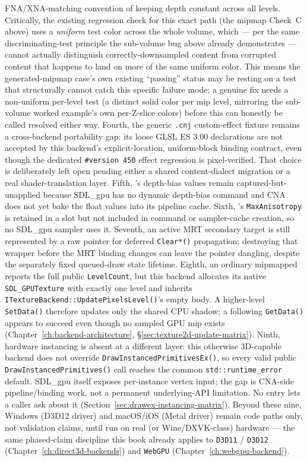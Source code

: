 FNA/XNA-matching convention of keeping depth constant across all levels. Critically, the
existing regression check for this exact path (the mipmap Check~C above) uses a
\emph{uniform} test color across the whole volume, which --- per the same discriminating-test
principle the sub-volume bug above already demonstrates --- cannot actually distinguish
correctly-downsampled content from corrupted content that happens to land on more of the same
uniform color. This means the generated-mipmap case's own existing ``passing'' status may be
resting on a test that structurally cannot catch this specific failure mode; a genuine fix
needs a non-uniform per-level test (a distinct solid color per mip level, mirroring the
sub-volume worked example's own per-Z-slice colors) before this can honestly be called
resolved either way. Fourth, the generic \texttt{.cnj} custom-effect fixture remains a
cross-backend portability gap: its loose GLSL ES 3.00 declarations are not accepted by this
backend's explicit-location, uniform-block binding contract, even though the dedicated
\texttt{\#version 450} effect regression is pixel-verified. That choice is deliberately left
open pending either a shared content-dialect migration or a real shader-translation layer.
Fifth, 's depth-bias values remain captured-but-unapplied because
SDL\_gpu has no dynamic depth-bias command and CNA does not yet bake the float values into its
pipeline cache. Sixth, 's \texttt{MaxAnisotropy} is retained in a slot
but not included in command or sampler-cache creation, so no SDL\_gpu sampler uses it. Seventh,
an active MRT secondary target is still represented by a raw pointer for deferred
\texttt{Clear\allowbreak{}*()} propagation; destroying that wrapper before the MRT binding changes can leave
the pointer dangling, despite the separately fixed queued-draw state lifetime. Eighth, an
ordinary mipmapped  reports the full public \texttt{LevelCount}, but this
backend allocates its native \texttt{SDL\_GPUTexture} with exactly one level and inherits
\texttt{ITextureBackend::UpdatePixelsLevel()}'s empty body. A higher-level
\texttt{SetData()} therefore updates only the shared CPU shadow; a following
\texttt{GetData()} appears to succeed even though no sampled GPU mip exists
(Chapter~\ref{ch:backend-architecture}, \S\ref{sec:texture2d-update-matrix}).
Ninth, hardware instancing is absent at a different layer: this otherwise 3D-capable backend
does not override \texttt{DrawInstancedPrimitivesEx()}, so every valid public
\texttt{DrawInstancedPrimitives()} call reaches the common
\texttt{std::runtime\_error} default. SDL\_gpu itself exposes per-instance vertex input; the
gap is CNA-side pipeline/binding work, not a permanent underlying-API limitation. No
 entry lets a caller ask about it
(Section~\ref{sec:drawex-instancing-matrix}).
Beyond these nine, Windows (D3D12 driver) and macOS/iOS (Metal driver)
remain code paths only, not validation claims, until run on real (or Wine/DXVK-class) hardware
--- the same phased-claim discipline this book already applies to \texttt{D3D11} /
\texttt{D3D12} (Chapter~\ref{ch:direct3d-backends}) and \texttt{WebGPU}
(Chapter~\ref{ch:webgpu-backend}).

